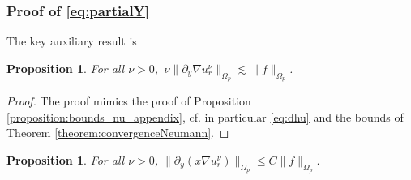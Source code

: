 \documentclass[report]{elsarticle}
\newtheorem{proposition}[theorem]{Proposition}
\numberwithin{theorem}{section}
\begin{document}
\subsubsection{Proof of \eqref{eq:partialY}}
The key auxiliary result is
\begin{proposition}
	\label{prop:nu_second}
For all $\nu>0$,\, $\nu\|\partial_y\nabla u^{\nu}_{r}\|_{\Omega_p}\lesssim \|f\|_{\Omega_p}$. 
\end{proposition}
\begin{proof}
	The proof mimics the proof of Proposition \ref{proposition:bounds_nu_appendix}, cf. in particular \eqref{eq:dhu} and the bounds of Theorem \ref{theorem:convergenceNeumann}.
\end{proof}
\begin{proposition}
	\label{prop:partialY}
	For all $\nu>0$, $\|\partial_y(x\nabla u^{\nu}_{r})\|_{\Omega_p}\leq C\|f\|_{\Omega_p}$. 
\end{proposition}
\end{document}

